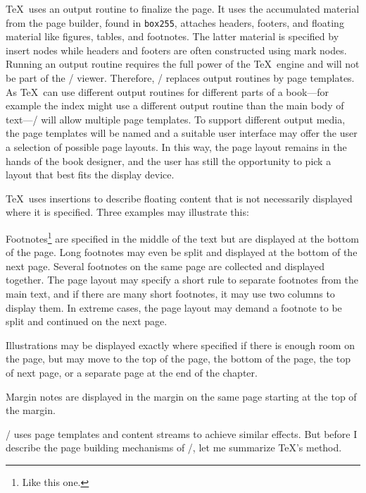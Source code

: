 \TeX\ uses an output routine to finalize the page. It uses the accumulated material
from the page builder, found in {\tt box255}, attaches headers, footers, and floating material
like figures, tables, and footnotes. The latter material is specified by insert nodes
while headers and footers are often constructed using mark nodes.
Running an output routine requires the full power of the \TeX\ engine and will not be
part of the \HINT/ viewer. Therefore, \HINT/ replaces output routines by page templates.
As \TeX\ can use different output routines for different parts of a book---for example
the index might use a different output routine than the main body of text---\HINT/
will allow multiple page templates. To support different output media, the page
templates will be named and a suitable user interface may offer the user a selection
of possible page layouts. In this way, the page layout remains in the hands of the
book designer, and the user has still the opportunity to pick a layout that best fits
the display device.

\TeX\ uses insertions to describe floating content that is not necessarily displayed
where it is specified. Three examples may illustrate this:
\itemize
\item Footnotes\footnote*{Like this one.}  are specified in the middle of the text but are displayed at the
bottom of the page. Long footnotes may even be split and displayed at the
bottom of the next page.  Several
footnotes on the same page are collected and displayed together. The
page layout may specify a short rule to separate footnotes from the
main text, and if there are many short footnotes, it may use two columns
to display them.  In extreme cases, the page layout may demand a
footnote to be split and continued on the next page.

\item Illustrations may be displayed exactly where specified if there is enough
room on the page, but may move to the top of the page, the bottom of the page,
the top of next page, or a separate page at the end of the chapter.

\item Margin notes are displayed in the margin on the same page starting at the top
of the margin.
\enditemize

\HINT/ uses page templates and content streams to achieve similar effects.
But before I describe the page building mechanisms of \HINT/, let me summarize \TeX's
method.

